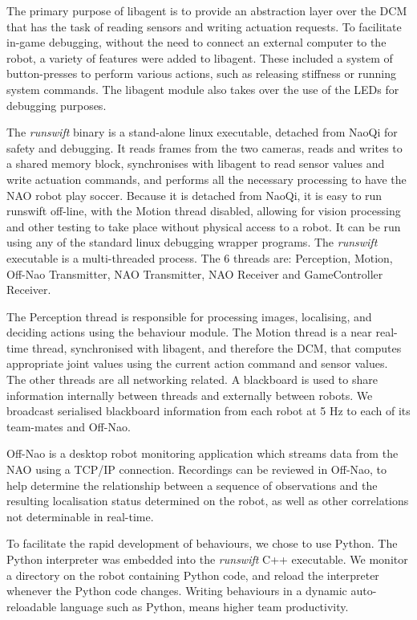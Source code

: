 \documentclass[runningheads,a4paper]{llncs}
\begin{document}
The primary purpose of libagent is to provide an abstraction layer over the DCM that has the task of reading sensors and writing actuation requests. To facilitate in-game debugging, without the need to connect an external computer to the robot, a variety of features were added to libagent. These included a system of button-presses to perform various actions, such as releasing stiffness or running system commands. The libagent module also takes over the use of the LEDs for debugging purposes. 

The \emph{runswift} binary is a stand-alone linux executable, detached from NaoQi for safety and debugging. It reads frames from the two cameras, reads and writes to a shared memory block, synchronises with libagent to read sensor values and write actuation commands, and performs all the necessary processing to have the NAO robot play soccer. Because it is detached from NaoQi, it is easy to run runswift off-line, with the Motion thread disabled, allowing for vision processing and other testing to take place without physical access to a robot. It can be run using any of the standard linux debugging wrapper programs. The \emph{runswift} executable is a multi-threaded process. The 6 threads are: Perception, Motion, Off-Nao Transmitter, NAO Transmitter, NAO Receiver and GameController Receiver. 

The Perception thread is responsible for processing images, localising, and deciding actions using the behaviour module. The Motion thread is a near real-time thread, synchronised with libagent, and therefore the DCM, that computes appropriate joint values using the current action command and sensor values. The other threads are all networking related. A blackboard is used to share information internally between threads and externally between robots. We broadcast serialised blackboard information from each robot at 5 Hz to each of its team-mates and Off-Nao.

Off-Nao is a desktop robot monitoring application which streams data from the NAO using a TCP/IP connection. Recordings can be reviewed in Off-Nao, to help determine the relationship between a sequence of observations and the resulting localisation status determined on the robot, as well as other correlations not determinable in real-time.

To facilitate the rapid development of behaviours, we chose to use Python. The Python interpreter was embedded into the \emph{runswift} C++ executable. We monitor a directory on the robot containing Python code, and reload the interpreter whenever the Python code changes. Writing behaviours in a dynamic auto-reloadable language such as Python, means higher  team productivity.
\end{document}
